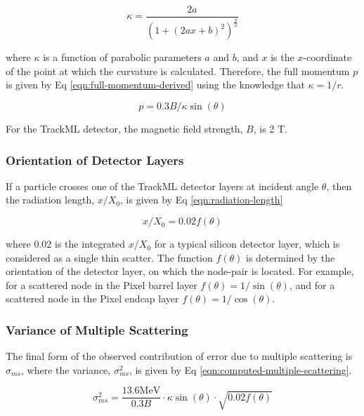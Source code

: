 \begin{equation}
\kappa = \frac{2a}{(1 + (2ax + b)^2)^{\frac{3}{2}}}
\label{eqn:kappa}
\end{equation}

where $\kappa$ is a function of parabolic parameters $a$ and $b$, and $x$ is the $x$-coordinate of the point at which the curvature is calculated. Therefore, the full momentum $p$ is given by Eq \eqref{eqn:full-momentum-derived} using the knowledge that $\kappa = 1/r$.

\begin{equation}
p = 0.3 B / \kappa \sin(\theta)
\label{eqn:full-momentum-derived}
\end{equation}

For the TrackML detector, the magnetic field strength, $B$, is 2 T.

\subsubsection{Orientation of Detector Layers}

If a particle crosses one of the TrackML detector layers at incident angle $\theta$, then the radiation length, $x/X_0$, is given by Eq \eqref{eqn:radiation-length}

\begin{equation}
x/X_0 = 0.02 f(\theta)
\label{eqn:radiation-length}
\end{equation}

where 0.02 is the integrated $x/X_0$ for a typical silicon detector layer, which is considered as a single thin scatter. The function $f(\theta)$ is determined by the orientation of the detector layer, on which the node-pair is located. For example, for a scattered node in the Pixel barrel layer $f(\theta) = 1 / \sin(\theta)$, and for a scattered node in the Pixel endcap layer $f(\theta) = 1 / \cos(\theta)$.




\subsubsection{Variance of Multiple Scattering}

The final form of the observed contribution of error due to multiple scattering is $\sigma_{ms}$, where the variance, $\sigma_{ms}^2$, is given by Eq \eqref{eqn:computed-multiple-scattering}.

\begin{equation}
    \sigma_{ms}^{2} = \frac{13.6 \text{MeV}}{0.3 B} \cdot \kappa \sin(\theta) \cdot \sqrt{0.02 f(\theta)}
    \label{eqn:computed-multiple-scattering}
\end{equation}



